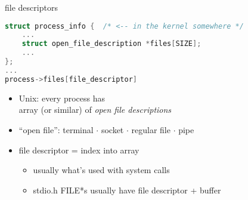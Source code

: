 \begin{frame}[fragile,label=fds]{file descriptors}
\begin{lstlisting}[language=C,style=smaller]
struct process_info {  /* <-- in the kernel somewhere */
    ...
    struct open_file_description *files[SIZE];
    ...
};
...
process->files[file_descriptor]
\end{lstlisting}
    \begin{itemize}
    \item Unix: every process has \\
        array (or similar) of \textit{open file descriptions}
    \item ``open file'': {\small terminal $\cdot$ socket $\cdot$ regular file $\cdot$ pipe}
    \item file descriptor = index into array
        \begin{itemize}
        \item usually what's used with system calls
        \item stdio.h FILE*s usually have file descriptor + buffer
        \end{itemize}
    \end{itemize}
\end{frame}


